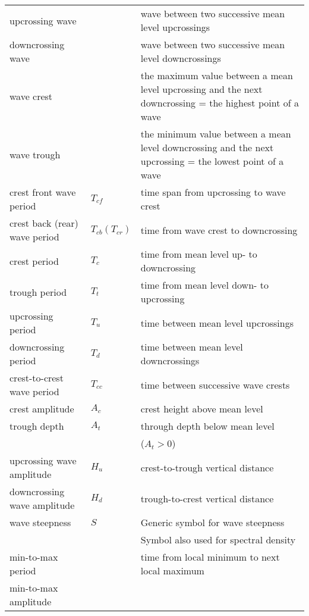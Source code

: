 \begin{table}
\begin{tabular}{p{57mm}p{10mm}p{70mm}}
\hline
upcrossing wave  \dotfill & &
wave between two successive mean level upcrossings \\
downcrossing wave  \dotfill & &
wave between two successive mean level downcrossings \\
wave crest  \dotfill&& the maximum value between a mean level upcrossing
and the next downcrossing = the highest point of a wave \\
wave trough  \dotfill&& the minimum value between a mean level downcrossing
and the next upcrossing = the lowest point of a wave \\ \hline
crest front wave period  \dotfill&  $T_{cf}$ &
time span from upcrossing to wave crest \\
crest back (rear) wave period  \dotfill& $T_{cb} (T_{cr})$ &
time from wave crest to downcrossing \\
crest period  \dotfill& $T_c$ &
time from mean level up- to downcrossing\\
trough period  \dotfill& $T_t$ &
time from mean level down- to upcrossing\\
upcrossing period  \dotfill& $T_u$ &
time between mean level upcrossings \\
downcrossing period  \dotfill& $T_d$ &
time between mean level downcrossings \\
crest-to-crest wave period  \dotfill& $T_{cc}$ & time
between successive wave crests\\ \hline
crest amplitude  \dotfill& $A_c$ &
crest height above mean level \\
trough depth \dotfill & $A_t$ &
through depth below mean level \\ &&($A_t > 0$)\\
upcrossing wave amplitude  \dotfill& $H_u$ &
crest-to-trough vertical distance \\
downcrossing wave amplitude  \dotfill& $H_d$ &
trough-to-crest vertical distance \\
wave steepness \dotfill & $S$ &
Generic symbol for wave steepness\\ && Symbol also used for spectral density \\
\hline
min-to-max  period  \dotfill& &
time from local minimum to next local maximum\\
min-to-max  amplitude  \dotfill& &

\end{tabular}
\end{table}
